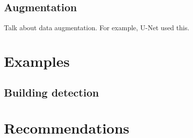 \documentclass[12pt, a4paper, oneside, headinclude, footinclude]{article}
\begin{document}
\subsection{Augmentation}

Talk about data augmentation. For example, U-Net used this.

\section{Examples}

\subsection{Building detection}

\section{Recommendations}


\renewcommand{\refname}{\spacedlowsmallcaps{References}} 





\end{document}
